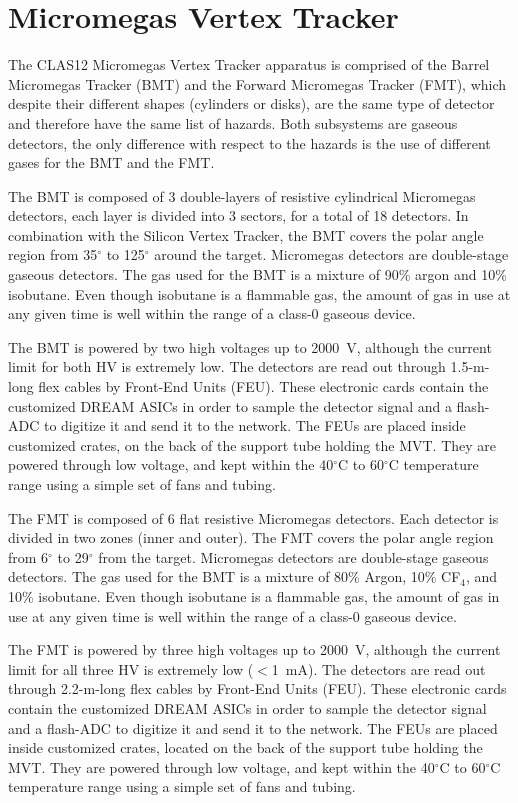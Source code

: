 \section{Micromegas Vertex Tracker}

The CLAS12 Micromegas Vertex Tracker apparatus is comprised of the Barrel Micromegas 
Tracker (BMT) and the Forward Micromegas Tracker (FMT), which despite their different 
shapes (cylinders or disks), are the same type of detector and therefore have the same 
list of hazards. Both subsystems are gaseous detectors, the only difference with respect 
to the hazards is the use of different gases for the BMT and the FMT.

The BMT is composed of 3 double-layers of resistive cylindrical Micromegas detectors, each 
layer is divided into 3 sectors, for a total of 18 detectors. In combination with the 
Silicon Vertex Tracker, the BMT covers the polar angle region from 35$^\circ$ to 125$^\circ$ 
around the target. Micromegas detectors are double-stage gaseous detectors. The gas  
used for the BMT is a mixture of 90\% argon and 10\% isobutane. Even though isobutane 
is a flammable gas, the amount of gas in use at any given time is well within the range of a 
class-0 gaseous device.

The BMT is powered by two high voltages up to 2000~V, although the current limit for both 
HV is extremely low. The detectors are read out through 1.5-m-long flex cables by Front-End 
Units (FEU). These electronic cards contain the customized DREAM ASICs in order to sample the 
detector signal and a flash-ADC to digitize it and send it to the network. The FEUs are placed 
inside customized crates, on the back of the support tube holding the MVT. They are powered 
through low voltage, and kept within the 40$^\circ$C to 60$^\circ$C temperature range using a 
simple set of fans and tubing.

The FMT is composed of 6 flat resistive Micromegas detectors. Each detector is divided in two 
zones (inner and outer). The FMT covers the polar angle region from 6$^\circ$ to 29$^\circ$ 
from the target. Micromegas detectors are double-stage gaseous detectors. The gas 
used for the BMT is a mixture of 80\% Argon, 10\% CF$_4$, and 10\% isobutane. Even though 
isobutane is a flammable gas, the amount of gas in use at any given time is well within the 
range of a class-0 gaseous device.

The FMT is powered by three high voltages up to 2000~V, although the current limit for all 
three HV is extremely low ($<$1~mA). The detectors are read out through 2.2-m-long flex cables 
by Front-End Units (FEU). These electronic cards contain the customized DREAM ASICs in order to 
sample the detector signal and a flash-ADC to digitize it and send it to the network. The FEUs 
are placed inside customized crates, located on the back of the support tube holding the MVT. 
They are powered through low voltage, and kept within the 40$^\circ$C to 60$^\circ$C temperature 
range using a simple set of fans and tubing.

